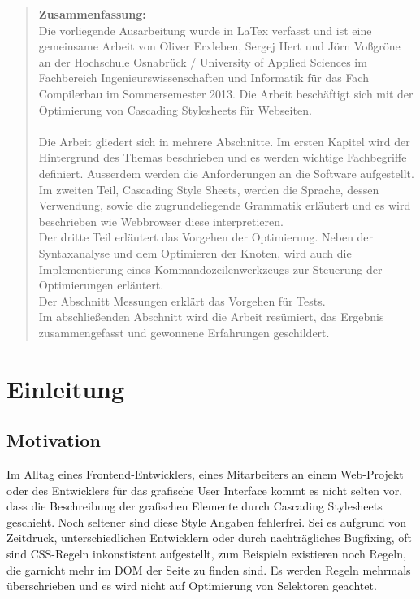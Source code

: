 \documentclass[11pt]{scrartcl}
\begin{document}
\begin{abstract}
\textbf{Zusammenfassung:}\\ 	
Die vorliegende Ausarbeitung wurde in LaTex verfasst und ist eine gemeinsame Arbeit von Oliver Erxleben, Sergej Hert und Jörn Voßgröne an der Hochschule Osnabrück / University of Applied Sciences im Fachbereich Ingenieurswissenschaften und Informatik für das Fach Compilerbau im Sommersemester 2013. Die Arbeit beschäftigt sich mit der Optimierung von Cascading Stylesheets für Webseiten.\\
\\
Die Arbeit gliedert sich in mehrere Abschnitte. Im ersten Kapitel wird der Hintergrund des Themas beschrieben und es werden wichtige Fachbegriffe definiert. Ausserdem werden die Anforderungen an die Software aufgestellt.\\
Im zweiten Teil, Cascading Style Sheets, werden die Sprache, dessen Verwendung, sowie die zugrundeliegende Grammatik erläutert und es wird beschrieben wie Webbrowser diese interpretieren.\\
Der dritte Teil erläutert das Vorgehen der Optimierung. Neben der Syntaxanalyse und dem Optimieren der Knoten, wird auch die Implementierung eines Kommandozeilenwerkzeugs zur Steuerung der Optimierungen erläutert.\\
Der Abschnitt Messungen erklärt das Vorgehen für Tests. \\ %
Im abschließenden Abschnitt wird die Arbeit resümiert, das Ergebnis zusammengefasst und gewonnene Erfahrungen geschildert.   
\end{abstract}

\pagebreak

\pagestyle{fancy}
\setcounter{page}{1} 

\section{Einleitung}
\subsection{Motivation}
Im Alltag eines Frontend-Entwicklers, eines Mitarbeiters an einem Web-Projekt oder des Entwicklers für das grafische User Interface kommt es nicht selten vor, dass die Beschreibung der grafischen Elemente durch Cascading Stylesheets geschieht. Noch seltener sind diese Style Angaben fehlerfrei. Sei es aufgrund von Zeitdruck, unterschiedlichen Entwicklern oder durch nachträgliches Bugfixing, oft sind CSS-Regeln inkonstistent aufgestellt, zum Beispieln existieren noch Regeln, die garnicht mehr im DOM der Seite zu finden sind. Es werden Regeln mehrmals überschrieben und es wird nicht auf Optimierung von Selektoren geachtet. 
\end{document}
